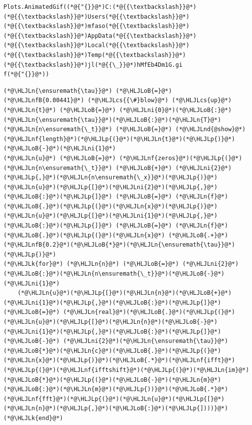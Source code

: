 \documentclass[12pt,a4paper]{article}
\newcommand{\HLJLk}[1]{\textcolor[RGB]{148,91,176}{\textbf{#1}}}
\newcommand{\HLJLn}[1]{#1}
\newcommand{\HLJLnd}[1]{\textcolor[RGB]{214,102,97}{#1}}
\newcommand{\HLJLnf}[1]{\textcolor[RGB]{66,102,213}{#1}}
\newcommand{\HLJLnfB}[1]{\textcolor[RGB]{59,151,46}{#1}}
\newcommand{\HLJLni}[1]{\textcolor[RGB]{59,151,46}{#1}}
\newcommand{\HLJLoB}[1]{\textcolor[RGB]{102,102,102}{\textbf{#1}}}
\newcommand{\HLJLp}[1]{#1}
\newcommand{\HLJLcs}[1]{\textcolor[RGB]{153,153,119}{\textit{#1}}}
\begin{document}
\begin{lstlisting}
Plots.AnimatedGif((*@{"{}}@*)C:(*@{{\textbackslash}}@*)(*@{{\textbackslash}}@*)Users(*@{{\textbackslash}}@*)(*@{{\textbackslash}}@*)mfaso(*@{{\textbackslash}}@*)(*@{{\textbackslash}}@*)AppData(*@{{\textbackslash}}@*)(*@{{\textbackslash}}@*)Local(*@{{\textbackslash}}@*)(*@{{\textbackslash}}@*)Temp(*@{{\textbackslash}}@*)(*@{{\textbackslash}}@*)jl(*@{{\_}}@*)hMfEb4Dm1G.gi
f(*@{"{}}@*))
\end{lstlisting}


\begin{lstlisting}
(*@\HLJLn{\ensuremath{\tau}}@*) (*@\HLJLoB{=}@*) (*@\HLJLnfB{0.00441}@*) (*@\HLJLcs{{\#}blow}@*) (*@\HLJLcs{up}@*)
(*@\HLJLn{t}@*) (*@\HLJLoB{=}@*) (*@\HLJLni{0}@*)(*@\HLJLoB{:}@*)(*@\HLJLn{\ensuremath{\tau}}@*)(*@\HLJLoB{:}@*)(*@\HLJLn{T}@*)
(*@\HLJLn{n\ensuremath{\_t}}@*) (*@\HLJLoB{=}@*) (*@\HLJLnd{@show}@*) (*@\HLJLnf{length}@*)(*@\HLJLp{(}@*)(*@\HLJLn{t}@*)(*@\HLJLp{)}@*)(*@\HLJLoB{-}@*)(*@\HLJLni{1}@*)
(*@\HLJLn{u}@*) (*@\HLJLoB{=}@*) (*@\HLJLnf{zeros}@*)(*@\HLJLp{(}@*)(*@\HLJLn{n\ensuremath{\_t}}@*) (*@\HLJLoB{+}@*) (*@\HLJLni{2}@*)(*@\HLJLp{,}@*)(*@\HLJLn{n\ensuremath{\_x}}@*)(*@\HLJLp{)}@*)
(*@\HLJLn{u}@*)(*@\HLJLp{[}@*)(*@\HLJLni{2}@*)(*@\HLJLp{,}@*)(*@\HLJLoB{:}@*)(*@\HLJLp{]}@*) (*@\HLJLoB{=}@*) (*@\HLJLn{f}@*)(*@\HLJLoB{.}@*)(*@\HLJLp{(}@*)(*@\HLJLn{x}@*)(*@\HLJLp{)}@*) 
(*@\HLJLn{u}@*)(*@\HLJLp{[}@*)(*@\HLJLni{1}@*)(*@\HLJLp{,}@*)(*@\HLJLoB{:}@*)(*@\HLJLp{]}@*) (*@\HLJLoB{=}@*) (*@\HLJLn{f}@*)(*@\HLJLoB{.}@*)(*@\HLJLp{(}@*)(*@\HLJLn{x}@*) (*@\HLJLoB{.+}@*) (*@\HLJLnfB{0.2}@*)(*@\HLJLoB{*}@*)(*@\HLJLn{\ensuremath{\tau}}@*)(*@\HLJLp{)}@*) 
(*@\HLJLk{for}@*) (*@\HLJLn{n}@*) (*@\HLJLoB{=}@*) (*@\HLJLni{2}@*)(*@\HLJLoB{:}@*)(*@\HLJLn{n\ensuremath{\_t}}@*)(*@\HLJLoB{-}@*)(*@\HLJLni{1}@*)
    (*@\HLJLn{u}@*)(*@\HLJLp{[}@*)(*@\HLJLn{n}@*)(*@\HLJLoB{+}@*)(*@\HLJLni{1}@*)(*@\HLJLp{,}@*)(*@\HLJLoB{:}@*)(*@\HLJLp{]}@*) (*@\HLJLoB{=}@*) (*@\HLJLn{real}@*)(*@\HLJLoB{.}@*)(*@\HLJLp{(}@*)(*@\HLJLn{u}@*)(*@\HLJLp{[}@*)(*@\HLJLn{n}@*)(*@\HLJLoB{-}@*)(*@\HLJLni{1}@*)(*@\HLJLp{,}@*)(*@\HLJLoB{:}@*)(*@\HLJLp{]}@*) (*@\HLJLoB{-}@*) (*@\HLJLni{2}@*)(*@\HLJLn{\ensuremath{\tau}}@*)(*@\HLJLoB{*}@*)(*@\HLJLn{c}@*)(*@\HLJLoB{.}@*)(*@\HLJLp{(}@*)(*@\HLJLn{x}@*)(*@\HLJLp{)}@*)(*@\HLJLoB{.*}@*)(*@\HLJLnf{ifft}@*)(*@\HLJLp{(}@*)(*@\HLJLnf{ifftshift}@*)(*@\HLJLp{(}@*)(*@\HLJLn{im}@*)(*@\HLJLoB{*}@*)(*@\HLJLp{(}@*)(*@\HLJLoB{-}@*)(*@\HLJLn{m}@*)(*@\HLJLoB{:}@*)(*@\HLJLn{m}@*)(*@\HLJLp{))}@*)(*@\HLJLoB{.*}@*)(*@\HLJLnf{fft}@*)(*@\HLJLp{(}@*)(*@\HLJLn{u}@*)(*@\HLJLp{[}@*)(*@\HLJLn{n}@*)(*@\HLJLp{,}@*)(*@\HLJLoB{:}@*)(*@\HLJLp{])))}@*)
(*@\HLJLk{end}@*)
\end{lstlisting}
\end{document}
